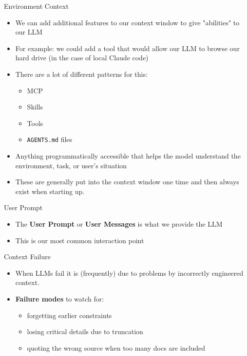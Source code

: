 \documentclass[aspectratio=169]{beamer}
\begin{document}
\begin{frame}{Environment Context}
\begin{itemize}
	\item We can add additional features to our context window to give "abilities" to our LLM
	\item For example: we could add a tool that would allow our LLM to browse our hard drive (in the case of local Claude code)
	\item There are a lot of different patterns for this:
\begin{itemize}
\item MCP
\item Skills
\item Tools
\item \texttt{AGENTS.md} files
\end{itemize}
\item Anything programmatically accessible that helps the model understand the environment, task, or user's situation
\item These are generally put into the context window one time and then always exist when starting up.
\end{itemize}
\end{frame}

\begin{frame}{User Prompt}
	\begin{itemize}
		\item The \textbf{User Prompt} or \textbf{User Messages} is what we provide the LLM
		\item This is our most common interaction point
	\end{itemize}
\end{frame}

\begin{frame}{Context Failure}
\begin{itemize}
	\item When LLMs fail it is (frequently) due to problems by incorrectly engineered context. 
    \item \textbf{Failure modes} to watch for:
    \begin{itemize}
        \item forgetting earlier constraints
        \item losing critical details due to truncation
        \item quoting the wrong source when too many docs are included
    \end{itemize}
	\end{itemize}
\end{frame}
\end{document}
